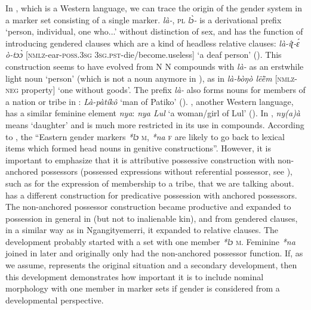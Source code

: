 \documentclass[output=collectionpaper]{langsci/langscibook}
\begin{document}
In , which is a Western  language, we can trace the origin of the gender system in a marker set consisting of a single marker.  \textit{là-}, \textsc{pl} \textit{lɔ̀-} is a derivational prefix `person, individual, one who...' without distinction of sex, and has the function of introducing gendered clauses which are a kind of headless relative clauses: \textit{là-íʈ-ɛ́ ò-tɔɔ̀} [\textsc{nmlz}-ear-\textsc{poss.3sg} \textsc{3sg.pst}-die/become.useless] `a deaf person' (\citealt[37]{Crazzolara1955}). This construction seems to have evolved from N N compounds with \textit{là-} as an erstwhile light noun `person' (which is not a noun anymore in ), as in \textit{là-bòŋò lëë̀m} [\textsc{nmlz-neg} property] `one without goods'. The prefix \textit{là-} also forms nouns for members of a nation or tribe in : \textit{Là-pàtíkô} `man of Patiko' (\citealt[42]{Crazzolara1955}). , another Western  language, has a similar feminine element \textit{nya}: \textit{nya Lul} `a woman/girl of Lul' (\citealt[17]{Kohnen1933}). In , \textit{ny(a)à} means `daughter' and is much more restricted in its use in compounds. According to \cite[263]{Heine1983}, the ``Eastern  gender markers \textit{*lɔ} \textsc{m}, \textit{*na} \textsc{f} are likely to go back to lexical items which formed head nouns in genitive constructions''. However, it is important to emphasize that it is attributive possessive construction with non-anchored possessors (possessed expressions without referential possessor, see \citealt{Koptjevskaja-Tamm2005}), such as for the expression of membership to a tribe, that we are talking about.  has a different construction for predicative possession with anchored possessors. The non-anchored possessor construction became productive and expanded to possession in general in  (but not to inalienable kin), and from gendered clauses, in a similar way as in Ngan\textquotesingle{}gityemerri, it expanded to relative clauses. The development probably started with a set with one member \textit{*lɔ} \textsc{m}. Feminine \textit{*na} joined in later and originally only had the non-anchored possessor function. If, as we assume,  represents the original situation and  a secondary development, then this development demonstrates how important it is to include nominal morphology with one member in marker sets if gender is considered from a developmental perspective.
\end{document}
